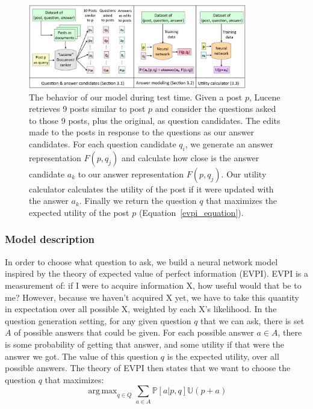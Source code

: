 \documentclass[11pt]{article}
\DeclareMathOperator*{\argmax}{arg\,max}
\newcommand{\U}{\mathbb{U}}
\begin{document}
\begin{figure}[t]
\centering
\includegraphics[width=0.85\textwidth]{model}
\caption{\small The behavior of our model during test time. Given a post $p$, Lucene retrieves 9 posts similar to post $p$ and consider the questions asked to those 9 posts, plus the original, as question candidates. The edits made to the posts in response to the questions as our answer candidates. For each question candidate $q_i$, we generate an answer representation $F(p,q_j)$ and calculate how close is the answer candidate $a_k$ to our answer representation $F(p,q_j)$. Our utility calculator calculates the utility of the post if it were updated with the answer $a_k$. Finally we return the question $q$ that maximizes the expected utility of the post $p$ (Equation~\ref{evpi_equation}).}
\label{model}
\end{figure}


\subsubsection{Model description}\label{model}

In order to choose what question to ask, we build a neural network model inspired by the theory of expected value of perfect information (EVPI). EVPI is a measurement of: if I were to acquire information X, how useful would that be to me? However, because we haven't acquired X yet, we have to take this quantity in expectation over all possible X, weighted by each X's likelihood. In the question generation setting, for any given question $q$ that we can ask, there is set $A$ of possible answers that could be given. For each possible answer $a \in A$, there is some probability of getting that answer, and some utility if that were the answer we got. The value of this question $q$ is the expected utility, over all possible answers. The theory of EVPI then states that we want to choose the question $q$ that maximizes:
\begin{equation}\label{evpi_equation}
\argmax_{q \in Q} \sum_{a \in A} \mathbb{P}[a | p,q] \U(p+a)
\end{equation} 
\end{document}
